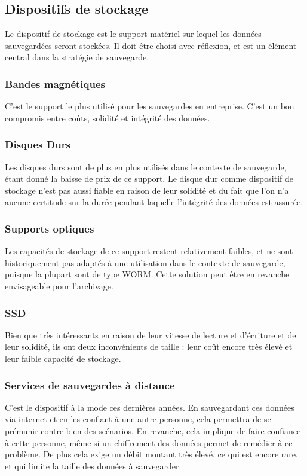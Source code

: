 \documentclass[a4paper,11pt]{report}
\begin{document}
\subsection{Dispositifs de stockage}
Le dispositif de stockage est le support matériel sur lequel les données sauvegardées seront stockées. Il doit être choisi avec réflexion, et est un élément central dans la stratégie de sauvegarde.

\subsubsection{Bandes magnétiques}
C'est le support le plus utilisé pour les sauvegardes en entreprise.
C'est un bon compromis entre coûts, solidité et intégrité des données.

\subsubsection{Disques Durs}
Les disques durs sont de plus en plus utilisés dans le contexte de sauvegarde, étant donné la baisse de prix de ce support.
Le disque dur comme dispositif de stockage n'est pas aussi fiable en raison de leur solidité et du fait que l'on n'a aucune certitude sur la durée pendant laquelle l'intégrité des données est assurée.

\subsubsection{Supports optiques}
Les capacités de stockage de ce support restent relativement faibles, et ne sont historiquement pas adaptés à une utilisation dans le contexte de sauvegarde, puisque la plupart sont de type WORM.
Cette solution peut être en revanche envisageable pour l'archivage.

\subsubsection{SSD}
Bien que très intéressants en raison de leur vitesse de lecture et d'écriture et de leur solidité, ils ont deux inconvénients de taille : leur coût encore très élevé et leur faible capacité de stockage.

\subsubsection{Services de sauvegardes à distance}
C'est le dispositif à la mode ces dernières années.
En sauvegardant ces données via internet et en les confiant à une autre personne, cela permettra de se prémunir contre bien des scénarios.
En revanche, cela implique de faire confiance à cette personne, même si un chiffrement des données permet de remédier à ce problème.
De plus cela exige un débit montant très élevé, ce qui est encore rare, et qui limite la taille des données à sauvegarder.
\end{document}
